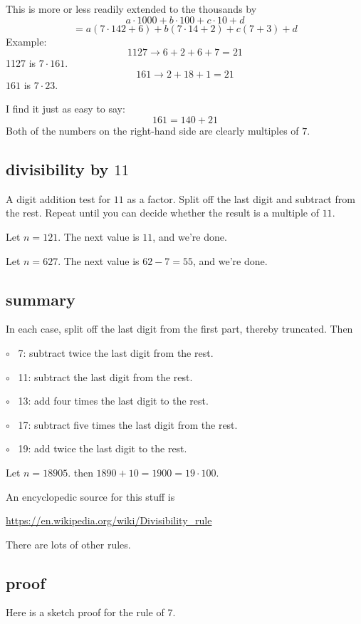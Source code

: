 \documentclass[11pt, oneside]{article}
\begin{document}
This is more or less readily extended to the thousands by
\[ a \cdot 1000 + b \cdot 100 + c \cdot 10 + d \]
\[ = a(7 \cdot 142 + 6) + b(7 \cdot 14 + 2) + c(7 + 3) + d \]
Example:
\[ 1127 \rightarrow 6 + 2 + 6 + 7 = 21 \]
1127 is $7 \cdot 161$.
\[ 161 \rightarrow 2 + 18 + 1 = 21 \]
$161$ is $7 \cdot 23$.

I find it just as easy to say:
\[ 161 = 140 + 21 \]
Both of the numbers on the right-hand side are clearly multiples of $7$.

\subsection*{divisibility by $11$}
A digit addition test for $11$ as a factor.  Split off the last digit and subtract from the rest.  Repeat until you can decide whether the result is a multiple of $11$.

Let $n = 121$.  The next value is $11$, and we're done.

Let $n = 627$.  The next value is $62 - 7 = 55$, and we're done.

\subsection*{summary}

In each case, split off the last digit from the first part, thereby truncated.  Then

$\circ$ \ 7:  subtract twice the last digit from the rest.

$\circ$ \ 11:  subtract the last digit from the rest.

$\circ$ \ 13:  add four times the last digit to the rest.

$\circ$ \ 17:  subtract five times the last digit from the rest.

$\circ$ \ 19:  add twice the last digit to the rest.

Let $n = 18905$.  then $1890 + 10 = 1900 = 19 \cdot 100$.

An encyclopedic source for this stuff is

\url{https://en.wikipedia.org/wiki/Divisibility_rule}

There are lots of other rules.

\subsection*{proof}

Here is a sketch proof for the rule of 7.  
\end{document}
